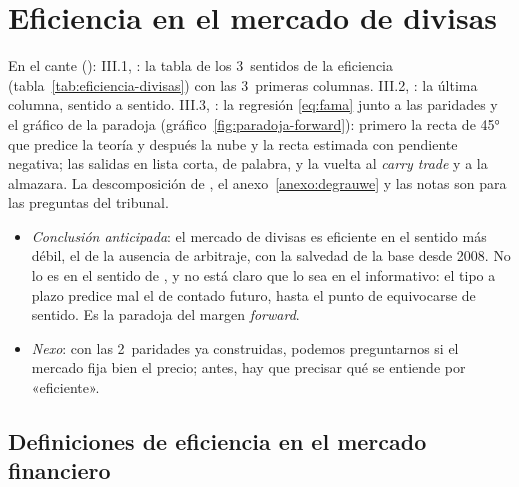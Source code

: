 \documentclass[11pt]{article}
\begin{document}
\section{Eficiencia en el mercado de divisas}\label{sec:eficiencia}

\begin{notaopositor}
En el cante (): III.1, : la tabla de los 3~sentidos de la eficiencia (tabla~\ref{tab:eficiencia-divisas}) con las 3~primeras columnas. III.2, : la última columna, sentido a sentido. III.3, : la regresión \eqref{eq:fama} junto a las paridades y el gráfico de la paradoja (gráfico~\ref{fig:paradoja-forward}): primero la recta de 45° que predice la teoría y después la nube y la recta estimada con pendiente negativa; las salidas en lista corta, de palabra, y la vuelta al \emph{carry trade} y a la almazara. La descomposición de , el anexo~\ref{anexo:degrauwe} y las notas son para las preguntas del tribunal.
\end{notaopositor}

\begin{itemize}
\item \emph{Conclusión anticipada}: el mercado de divisas es eficiente en el sentido más débil, el de la ausencia de arbitraje, con la salvedad de la base desde 2008. No lo es en el sentido de , y no está claro que lo sea en el informativo: el tipo a plazo predice mal el de contado futuro, hasta el punto de equivocarse de sentido. Es la paradoja del margen \emph{forward}.
\item \emph{Nexo}: con las 2~paridades ya construidas, podemos preguntarnos si el mercado fija bien el precio; antes, hay que precisar qué se entiende por «eficiente».
\end{itemize}

\subsection{Definiciones de eficiencia en el mercado financiero}\label{sec:definiciones-eficiencia}
\end{document}
